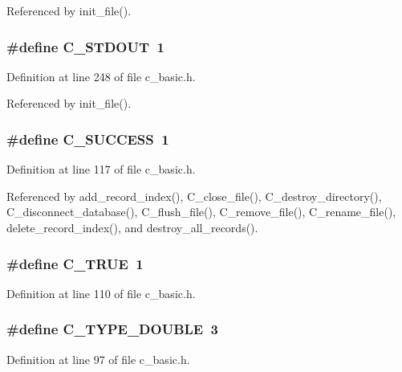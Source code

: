 Referenced by init\_\-file().
\subsubsection{\setlength{\rightskip}{0pt plus 5cm}\#define C\_\-STDOUT~1}\label{c__basic_8h_e6ff2bb824c04cd851420c23402e7076}




Definition at line 248 of file c\_\-basic.h.

Referenced by init\_\-file().
\subsubsection{\setlength{\rightskip}{0pt plus 5cm}\#define C\_\-SUCCESS~1}\label{c__basic_8h_a1eaa83f2f2cf915c473883c5962f73e}




Definition at line 117 of file c\_\-basic.h.

Referenced by add\_\-record\_\-index(), C\_\-close\_\-file(), C\_\-destroy\_\-directory(), C\_\-disconnect\_\-database(), C\_\-flush\_\-file(), C\_\-remove\_\-file(), C\_\-rename\_\-file(), delete\_\-record\_\-index(), and destroy\_\-all\_\-records().
\subsubsection{\setlength{\rightskip}{0pt plus 5cm}\#define C\_\-TRUE~1}\label{c__basic_8h_a2d550866e0ebe5ff2557db55cc64dba}




Definition at line 110 of file c\_\-basic.h.
\subsubsection{\setlength{\rightskip}{0pt plus 5cm}\#define C\_\-TYPE\_\-DOUBLE~3}\label{c__basic_8h_8ddd68471fb3ed04fae9f2214c79761f}




Definition at line 97 of file c\_\-basic.h.

